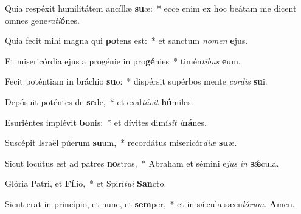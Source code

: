 ﻿\setcounter{enumi}{2}
\item Quia respéxit humilitátem ancíllæ \textbf{su}æ:~* ecce enim ex hoc beátam me dicent omnes gene\textit{ra}\textit{ti}\textbf{ó}nes.

\item Quia fecit mihi magna qui \textbf{po}tens est:~* et sanctum \textit{no}\textit{men} \textbf{e}jus.

\item Et misericórdia ejus a progénie in pro\textbf{gé}nies~* timén\textit{ti}\textit{bus} \textbf{e}um.

\item Fecit poténtiam in bráchio \textbf{su}o:~* dispérsit supérbos mente \textit{cor}\textit{dis} \textbf{su}i.

\item Depósuit poténtes de \textbf{se}de,~* et exal\textit{tá}\textit{vit} \textbf{hú}miles.

\item Esuriéntes implévit \textbf{bo}nis:~* et dívites dimí\textit{sit} \textit{i}\textbf{ná}nes.

\item Suscépit Israël púerum \textbf{su}um,~* recordátus misericór\textit{di}\textit{æ} \textbf{su}æ.

\item Sicut locútus est ad patres \textbf{no}stros,~* Abraham et sémini e\textit{jus} \textit{in} \textbf{sǽ}cula.

\item Glória Patri, et \textbf{Fí}lio,~* et Spirí\textit{tu}\textit{i} \textbf{San}cto.

\item Sicut erat in princípio, et nunc, et \textbf{sem}per,~* et in sǽcula sæcu\textit{ló}\textit{rum}. \textbf{A}men.